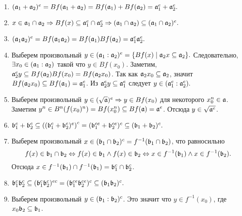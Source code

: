     \begin{Proof}
        \begin{enumerate}
            \item $(\mathfrak{a}_1 + \mathfrak{a}_2)^e = Bf(\mathfrak{a}_1 + \mathfrak{a}_2) = Bf(\mathfrak{a}_1) + Bf(\mathfrak{a}_2) = \mathfrak{a}_1^e + \mathfrak{a}_2^e.$
            \item $x \in \mathfrak{a}_1 \cap \mathfrak{a}_2 \Rightarrow Bf(x) \subseteq \mathfrak{a}_1^e \cap \mathfrak{a}_2^e \Rightarrow (\mathfrak{a}_1 \cap \mathfrak{a}_2) \subseteq (\mathfrak{a}_1 \cap \mathfrak{a}_2)^e.$
            \item $(\mathfrak{a}_1\mathfrak{a}_2)^e = Bf(\mathfrak{a}_1\mathfrak{a}_2) = Bf(\mathfrak{a}_1)Bf(\mathfrak{a}_2) = \mathfrak{a}_1^e\mathfrak{a}_2^e.$
            \item Выберем произвольный $y \in (\mathfrak{a}_1 : \mathfrak{a}_2)^e = \{Bf(x) \mid \mathfrak{a}_2x \subseteq \mathfrak{a}_2 \}.$ \newline
                Следовательно, $\exists x_0 \in (\mathfrak{a}_1 : \mathfrak{a}_2)$ такой что $y \in Bf(x_0).$ 
                Заметим, \linebreak $\mathfrak{a}_2^ey \subseteq Bf(\mathfrak{a}_2)Bf(x_0) = Bf(\mathfrak{a}_2x_0)$. \newline
                Так как $\mathfrak{a}_2x_0 \subseteq \mathfrak{a}_2$, значит $Bf(\mathfrak{a}_2x_0) \subseteq Bf(\mathfrak{a}_1) = \mathfrak{a}_1^e$. 
                Из $\mathfrak{a}_2^ey \subseteq \mathfrak{a}_1^e$ следует $y \in (\mathfrak{a}_1^e : \mathfrak{a}_2^e).$
            \item Выберем произвольный $y \in (\sqrt{\mathfrak{a}})^e \Rightarrow y \in Bf(x_0)$ для некоторого $x_0^n \in \mathfrak{a}$.
                Заметим $y^n \in B^n(f(x_0)^n) = Bf(x_0^n) \subseteq Bf(\mathfrak{a}) = \mathfrak{a}^e$. Отсюда $y \in \sqrt{\mathfrak{a}^e}$.
            \item $\mathfrak{b}_1^c + \mathfrak{b}_2^c \subseteq (\left(\mathfrak{b}_1^c + \mathfrak{b}_2^c)^e\right)^c = (\mathfrak{b}_1^{ce} + \mathfrak{b}_2^{ce})^c \subseteq (\mathfrak{b}_1 + \mathfrak{b}_2)^c.$
            \item Выберем произвольный $x \in (\mathfrak{b}_1 \cap \mathfrak{b}_2)^c = f^{-1}(\mathfrak{b}_1 \cap \mathfrak{b}_2)$, что равносильно
                $$
                    f(x) \in \mathfrak{b}_1 \cap \mathfrak{b}_2 \Leftrightarrow f(x) \in \mathfrak{b}_1 \wedge f(x) \in \mathfrak{b}_2 \Leftrightarrow x \in f^{-1}(\mathfrak{b}_1) \wedge x \in f^{-1}(\mathfrak{b}_2).
                $$
                Отсюда $x \in f^{-1}(\mathfrak{b}_1) \cap f^{-1}(\mathfrak{b}_1) = \mathfrak{b}_1^c \cap \mathfrak{b}_2^c$.
            \item $\mathfrak{b}_1^c\mathfrak{b}_2^c \subseteq (\mathfrak{b}_1^c\mathfrak{b}_2^c)^{ec} = (\mathfrak{b}_1^{ce}\mathfrak{b}_2^{ce})^c \subseteq (\mathfrak{b}_1\mathfrak{b}_2)^c.$
            \item Выберем произвольный $y \in (\mathfrak{b}_1 : \mathfrak{b}_2)^c$. Это значит что $y \in f^{-1}(x_0)$, где $x_0\mathfrak{b}_2 \subseteq \mathfrak{b}_1$.
            

\end{enumerate}
\end{Proof}
